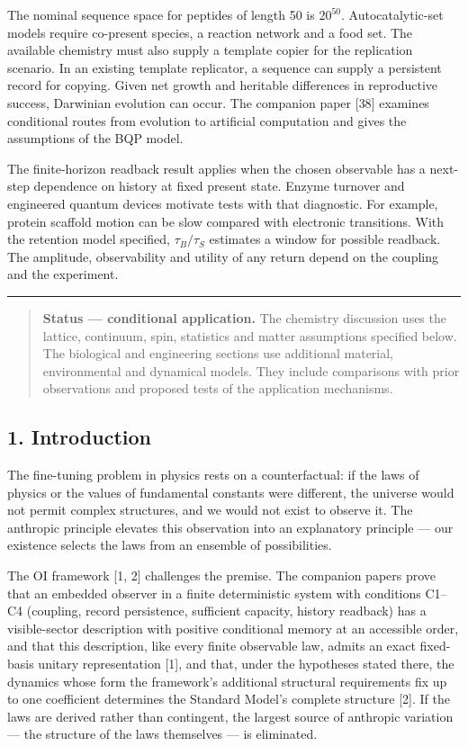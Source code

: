 \documentclass[
]{article}
\begin{document}
The nominal sequence space for peptides of length 50 is \(20^{50}\).
Autocatalytic-set models require co-present species, a reaction network
and a food set. The available chemistry must also supply a template
copier for the replication scenario. In an existing template replicator,
a sequence can supply a persistent record for copying. Given net growth
and heritable differences in reproductive success, Darwinian evolution
can occur. The companion paper {[}38{]} examines conditional routes from
evolution to artificial computation and gives the assumptions of the BQP
model.

The finite-horizon readback result applies when the chosen observable
has a next-step dependence on history at fixed present state. Enzyme
turnover and engineered quantum devices motivate tests with that
diagnostic. For example, protein scaffold motion can be slow compared
with electronic transitions. With the retention model specified,
\(\tau_B/\tau_S\) estimates a window for possible readback. The
amplitude, observability and utility of any return depend on the
coupling and the experiment.

\begin{center}\rule{0.5\linewidth}{0.5pt}\end{center}

\begin{quote}
\textbf{Status --- conditional application.} The chemistry discussion
uses the lattice, continuum, spin, statistics and matter assumptions
specified below. The biological and engineering sections use additional
material, environmental and dynamical models. They include comparisons
with prior observations and proposed tests of the application
mechanisms.
\end{quote}

\hypertarget{introduction}{%
\subsection{1. Introduction}\label{introduction}}

The fine-tuning problem in physics rests on a counterfactual: if the
laws of physics or the values of fundamental constants were different,
the universe would not permit complex structures, and we would not exist
to observe it. The anthropic principle elevates this observation into an
explanatory principle --- our existence selects the laws from an
ensemble of possibilities.

The OI framework {[}1, 2{]} challenges the premise. The companion papers
prove that an embedded observer in a finite deterministic system with
conditions C1--C4 (coupling, record persistence, sufficient capacity,
history readback) has a visible-sector description with positive
conditional memory at an accessible order, and that this description,
like every finite observable law, admits an exact fixed-basis unitary
representation {[}1{]}, and that, under the hypotheses stated there, the
dynamics whose form the framework's additional structural requirements
fix up to one coefficient determines the Standard Model's complete
structure {[}2{]}. If the laws are derived rather than contingent, the
largest source of anthropic variation --- the structure of the laws
themselves --- is eliminated.
\end{document}
